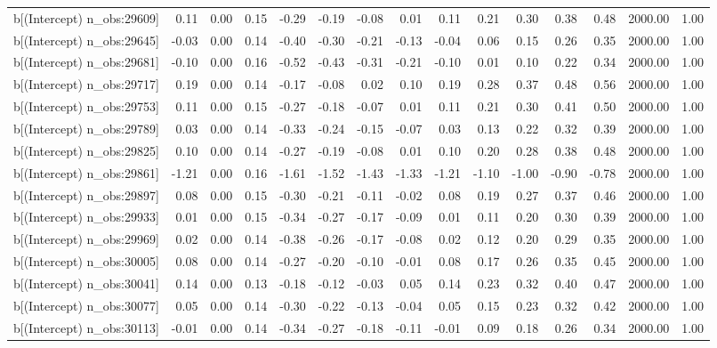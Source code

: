 \begin{table}[ht]
\begin{tabular}{rrrrrrrrrrrrrrr}
  b[(Intercept) n\_obs:29609] & 0.11 & 0.00 & 0.15 & -0.29 & -0.19 & -0.08 & 0.01 & 0.11 & 0.21 & 0.30 & 0.38 & 0.48 & 2000.00 & 1.00 \\ 
  b[(Intercept) n\_obs:29645] & -0.03 & 0.00 & 0.14 & -0.40 & -0.30 & -0.21 & -0.13 & -0.04 & 0.06 & 0.15 & 0.26 & 0.35 & 2000.00 & 1.00 \\ 
  b[(Intercept) n\_obs:29681] & -0.10 & 0.00 & 0.16 & -0.52 & -0.43 & -0.31 & -0.21 & -0.10 & 0.01 & 0.10 & 0.22 & 0.34 & 2000.00 & 1.00 \\ 
  b[(Intercept) n\_obs:29717] & 0.19 & 0.00 & 0.14 & -0.17 & -0.08 & 0.02 & 0.10 & 0.19 & 0.28 & 0.37 & 0.48 & 0.56 & 2000.00 & 1.00 \\ 
  b[(Intercept) n\_obs:29753] & 0.11 & 0.00 & 0.15 & -0.27 & -0.18 & -0.07 & 0.01 & 0.11 & 0.21 & 0.30 & 0.41 & 0.50 & 2000.00 & 1.00 \\ 
  b[(Intercept) n\_obs:29789] & 0.03 & 0.00 & 0.14 & -0.33 & -0.24 & -0.15 & -0.07 & 0.03 & 0.13 & 0.22 & 0.32 & 0.39 & 2000.00 & 1.00 \\ 
  b[(Intercept) n\_obs:29825] & 0.10 & 0.00 & 0.14 & -0.27 & -0.19 & -0.08 & 0.01 & 0.10 & 0.20 & 0.28 & 0.38 & 0.48 & 2000.00 & 1.00 \\ 
  b[(Intercept) n\_obs:29861] & -1.21 & 0.00 & 0.16 & -1.61 & -1.52 & -1.43 & -1.33 & -1.21 & -1.10 & -1.00 & -0.90 & -0.78 & 2000.00 & 1.00 \\ 
  b[(Intercept) n\_obs:29897] & 0.08 & 0.00 & 0.15 & -0.30 & -0.21 & -0.11 & -0.02 & 0.08 & 0.19 & 0.27 & 0.37 & 0.46 & 2000.00 & 1.00 \\ 
  b[(Intercept) n\_obs:29933] & 0.01 & 0.00 & 0.15 & -0.34 & -0.27 & -0.17 & -0.09 & 0.01 & 0.11 & 0.20 & 0.30 & 0.39 & 2000.00 & 1.00 \\ 
  b[(Intercept) n\_obs:29969] & 0.02 & 0.00 & 0.14 & -0.38 & -0.26 & -0.17 & -0.08 & 0.02 & 0.12 & 0.20 & 0.29 & 0.35 & 2000.00 & 1.00 \\ 
  b[(Intercept) n\_obs:30005] & 0.08 & 0.00 & 0.14 & -0.27 & -0.20 & -0.10 & -0.01 & 0.08 & 0.17 & 0.26 & 0.35 & 0.45 & 2000.00 & 1.00 \\ 
  b[(Intercept) n\_obs:30041] & 0.14 & 0.00 & 0.13 & -0.18 & -0.12 & -0.03 & 0.05 & 0.14 & 0.23 & 0.32 & 0.40 & 0.47 & 2000.00 & 1.00 \\ 
  b[(Intercept) n\_obs:30077] & 0.05 & 0.00 & 0.14 & -0.30 & -0.22 & -0.13 & -0.04 & 0.05 & 0.15 & 0.23 & 0.32 & 0.42 & 2000.00 & 1.00 \\ 
  b[(Intercept) n\_obs:30113] & -0.01 & 0.00 & 0.14 & -0.34 & -0.27 & -0.18 & -0.11 & -0.01 & 0.09 & 0.18 & 0.26 & 0.34 & 2000.00 & 1.00 \\ 

\end{tabular}
\end{table}
